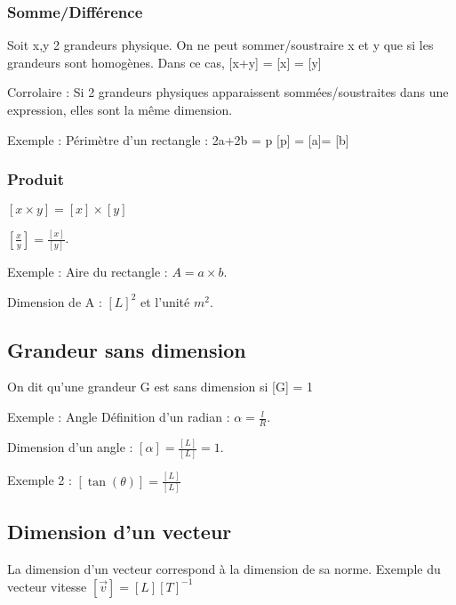 \documentclass[french]{yLectureNote}
\begin{document}
\subsubsection{Somme/Différence}
Soit x,y 2 grandeurs physique. On ne peut sommer/soustraire x et y que si les grandeurs sont homogènes. Dans ce cas, [x+y] = [x] = [y]

Corrolaire : Si 2 grandeurs physiques apparaissent sommées/soustraites dans une expression, elles sont la m\^eme dimension.

Exemple : Périmètre d'un rectangle : 2a+2b = p [p] = [a]= [b]

\subsubsection{Produit}
$[x\times y] = [x] \times [y]$

$[\frac{x}{y}] = \frac{[x]}{[y]}$.

Exemple : Aire du rectangle : $A = a\times b$.

Dimension de A : $[L]^2$ et l'unité $m^2$.

\subsection{Grandeur sans dimension}
On dit qu'une grandeur G est sans dimension si [G] = 1

Exemple : Angle
Définition d'un radian : $\alpha = \frac{l}{R}$.

Dimension d'un angle : $[\alpha] = \frac{[L]}{[L]} = 1$.


Exemple 2 : $[\tan(\theta)] = \frac{[L]}{[L]}$

\subsection{Dimension d'un vecteur}
La dimension d'un vecteur correspond à la dimension de sa norme. Exemple du vecteur vitesse $[\overrightarrow{v}] = [L][T]^{-1}$
\end{document}
